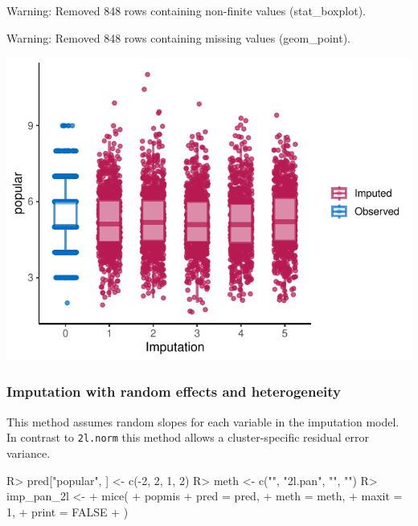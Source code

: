 \documentclass[
]{jss}
\begin{document}
\begin{CodeChunk}
\begin{CodeOutput}
Warning: Removed 848 rows containing non-finite values (stat_boxplot).
\end{CodeOutput}
\begin{CodeOutput}
Warning: Removed 848 rows containing missing values (geom_point).
\end{CodeOutput}


\begin{center}\includegraphics{Imputation_of_Incomplete_Multilevel_Data_files/figure-latex/pop_norm_eval-1} \end{center}

\end{CodeChunk}

\hypertarget{imputation-with-random-effects-and-heterogeneity}{%
\subsubsection{Imputation with random effects and
heterogeneity}\label{imputation-with-random-effects-and-heterogeneity}}

This method assumes random slopes for each variable in the imputation
model. In contrast to \texttt{2l.norm} this method allows a
cluster-specific residual error variance.

\begin{CodeChunk}
\begin{CodeInput}
R> pred["popular", ] <- c(-2, 2, 1, 2)
R> meth <- c("", "2l.pan", "", "")
R> imp_pan_2l <-
+   mice(
+     popmis %
+     pred = pred,
+     meth = meth,
+     maxit = 1,
+     print = FALSE
+   )
\end{CodeInput}
\end{CodeChunk}
\end{document}
